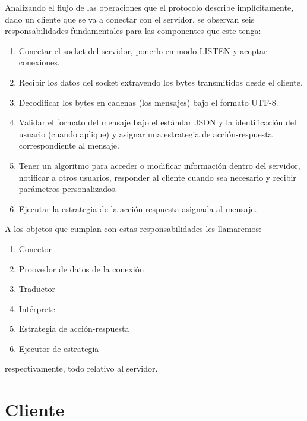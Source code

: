 \documentclass[12pt, a4paper]{report}
\begin{document}
Analizando el flujo de las operaciones que el protocolo describe implícitamente, dado un cliente que se va a conectar con el servidor, se observan seis responsabilidades fundamentales para las componentes que este tenga:

\begin{enumerate}
	\item Conectar el socket del servidor, ponerlo en modo LISTEN y aceptar conexiones.
	\item Recibir los datos del socket extrayendo los bytes transmitidos desde el cliente.
	\item Decodificar los bytes en cadenas (los mensajes) bajo el formato UTF-8.
	\item Validar el formato del mensaje bajo el estándar JSON y la identificación del usuario (cuando aplique) y asignar una estrategia de acción-respuesta correspondiente al mensaje.
	\item Tener un algoritmo para acceder o modificar información dentro del servidor, notificar a otros usuarios, responder al cliente cuando sea necesario y recibir parámetros personalizados.
	\item Ejecutar la estrategia de la acción-respuesta asignada al mensaje.
\end{enumerate}

A los objetos que cumplan con estas responsabilidades les llamaremos:

\begin{enumerate}
	\item Conector
	\item Proovedor de datos de la conexión
	\item Traductor
	\item Intérprete
	\item Estrategia de acción-respuesta
	\item Ejecutor de estrategia
\end{enumerate}

respectivamente, todo relativo al servidor.

\section{Cliente}


\end{document}
